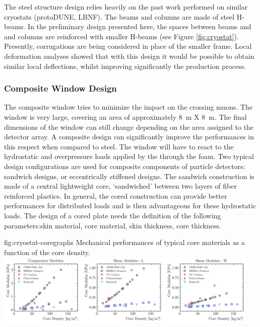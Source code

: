 The steel structure design relies heavily on the past work performed on similar cryostats (protoDUNE, LBNF). The beams and columns are made of steel H-beams. In the preliminary design presented here, the spaces between beams and and columns are reinforced with smaller H-beams (see Figure \ref{fig:cryostat}). Presently, corrugations are being considered in place of the smaller frame. Local deformation analyses showed that with this design it would be possible to obtain similar local deflections, whilst improving significantly the production process.

\subsubsection{Composite Window Design}
\label{sec:cryost-des-composite}

The composite window tries to minimize the impact on the crossing muons.  The window is very large, covering an area of approximately \SI{8}{\m} X \SI{8}{\m}. The final dimensions of the window can still change depending on the area assigned to the detector array. A composite design can significantly improve the performances in this respect when compared to steel. The window will have to react to the hydrostatic and overpressure loads applied by the  through the foam. Two typical design configurations are used for composite components of particle detectors: sandwich designs, or eccentrically stiffened designs. The sandwich construction is made of a central lightweight core, ‘sandwiched’ between two layers of fiber reinforced plastics. In general, the cored construction can provide better performances for distributed loads and is then advantageous for these hydrostatic loads. The design of a cored plate needs the definition of the following parameters:skin material, core material, skin thickness, core thickness.

\begin{dunefigure}{fig:cryostat-coregraphs}
{Mechanical performances of typical core materials as a function of the core density.}
\includegraphics[width=0.95\textwidth]{graphics/cryostat/cryostat-coregraphs.png}
\end{dunefigure}


